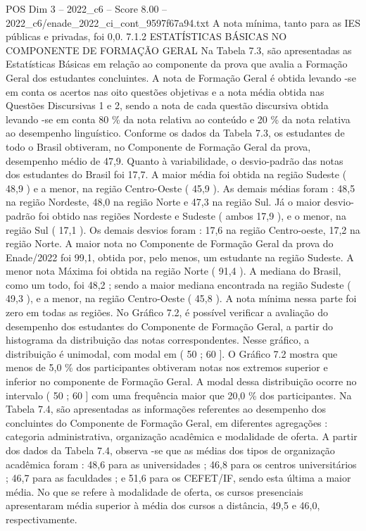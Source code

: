 \begin{textsample}{POS Dim 3 – 2022\_c6 – Score 8.00 – 2022\_c6/enade\_2022\_ci\_cont\_9597f67a94.txt}
A nota mínima, tanto para as IES públicas e privadas, foi 0,0. 7.1.2 ESTATÍSTICAS BÁSICAS NO COMPONENTE DE FORMAÇÃO GERAL Na Tabela 7.3, são apresentadas as Estatísticas Básicas em relação ao componente da prova que avalia a Formação Geral dos estudantes concluintes.
A nota de Formação Geral é obtida levando -se em conta os acertos nas oito questões objetivas e a nota média obtida nas Questões Discursivas 1 e 2, sendo a nota de cada questão discursiva obtida levando -se em conta 80 \% da nota relativa ao conteúdo e 20 \% da nota relativa ao desempenho linguístico.
Conforme os dados da Tabela 7.3, os estudantes de todo o Brasil obtiveram, no Componente de Formação Geral da prova, desempenho médio de 47,9.
Quanto à variabilidade, o desvio-padrão das notas dos estudantes do Brasil foi 17,7.
A maior média foi obtida na região Sudeste ( 48,9 ) e a menor, na região Centro-Oeste ( 45,9 ).
As demais médias foram : 48,5 na região Nordeste, 48,0 na região Norte e 47,3 na região Sul.
Já o maior desvio-padrão foi obtido nas regiões Nordeste e Sudeste ( ambos 17,9 ), e o menor, na região Sul ( 17,1 ).
Os demais desvios foram : 17,6 na região Centro-oeste, 17,2 na região Norte.
A maior nota no Componente de Formação Geral da prova do Enade/2022 foi 99,1, obtida por, pelo menos, um estudante na região Sudeste.
A menor nota Máxima foi obtida na região Norte ( 91,4 ).
A mediana do Brasil, como um todo, foi 48,2 ; sendo a maior mediana encontrada na região Sudeste ( 49,3 ), e a menor, na região Centro-Oeste ( 45,8 ).
A nota mínima nessa parte foi zero em todas as regiões.
No Gráfico 7.2, é possível verificar a avaliação do desempenho dos estudantes do Componente de Formação Geral, a partir do histograma da distribuição das notas correspondentes.
Nesse gráfico, a distribuição é unimodal, com modal em ( 50 ; 60 ].
O Gráfico 7.2 mostra que menos de 5,0 \% dos participantes obtiveram notas nos extremos superior e inferior no componente de Formação Geral.
A modal dessa distribuição ocorre no intervalo ( 50 ; 60 ] com uma frequência maior que 20,0 \% dos participantes.
Na Tabela 7.4, são apresentadas as informações referentes ao desempenho dos concluintes do Componente de Formação Geral, em diferentes agregações : categoria administrativa, organização acadêmica e modalidade de oferta.
A partir dos dados da Tabela 7.4, observa -se que as médias dos tipos de organização acadêmica foram : 48,6 para as universidades ; 46,8 para os centros universitários ; 46,7 para as faculdades ; e 51,6 para os CEFET/IF, sendo esta última a maior média.
No que se refere à modalidade de oferta, os cursos presenciais apresentaram média superior à média dos cursos a distância, 49,5 e 46,0, respectivamente.

\end{textsample}
